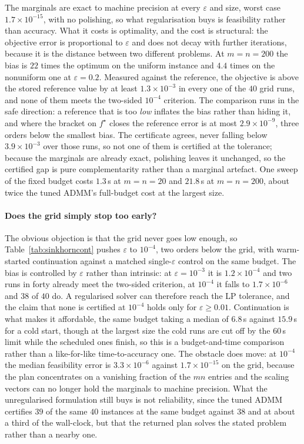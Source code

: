 \documentclass{article}
\newcommand{\Tol}[1]{10^{-#1}}
\begin{document}
The marginals are exact to machine precision at every $\varepsilon$ and size, worst case
$1.7\times\Tol{15}$, with no polishing, so what regularisation buys is feasibility rather
than accuracy. What it costs is optimality, and the cost is structural: the objective error
is proportional to $\varepsilon$ and does not decay with further iterations, because it is
the distance between two different problems. At $m=n=200$ the bias is $22$ times the optimum
on the uniform instance and $4.4$ times on the nonuniform one at $\varepsilon=0.2$. Measured
against the reference, the objective is above the stored reference value by at least
$1.3\times\Tol{3}$ in every one of the $40$ grid runs, and none of them meets the two-sided
$\Tol{4}$ criterion. The comparison runs in the safe direction: a reference that is too
\emph{low} inflates the bias rather than hiding it, and where the bracket on $f^\star$ closes
the reference error is at most $2.9\times\Tol{9}$, three orders below the smallest bias. The
certificate agrees, never falling below $3.9\times\Tol{3}$ over those runs, so not one of
them is certified at the tolerance; because the marginals are already exact, polishing
leaves it unchanged, so the certified gap is pure complementarity rather than a marginal
artefact. One sweep of the fixed budget costs $1.3$\,s at $m=n=20$ and $21.8$\,s at
$m=n=200$, about twice the tuned ADMM's full-budget cost at the largest size.

\paragraph{Does the grid simply stop too early?}
The obvious objection is that the grid never goes low enough, so
Table~\ref{tab:sinkhorncont} pushes $\varepsilon$ to $\Tol{4}$, two orders below the grid,
with warm-started continuation against a matched single-$\varepsilon$ control on the same
budget. The bias is controlled by $\varepsilon$ rather than intrinsic: at
$\varepsilon=\Tol{3}$ it is $1.2\times\Tol{4}$ and two runs in forty already meet the
two-sided criterion, at $\Tol{4}$ it falls to $1.7\times\Tol{6}$ and $38$ of $40$ do. A
regularised solver can therefore reach the LP tolerance, and the claim that none is certified
at $\Tol{4}$ holds only for $\varepsilon\ge0.01$. Continuation is what makes it affordable,
the same budget taking a median of $6.8$\,s against $15.9$\,s for a cold start, though at the
largest size the cold runs are cut off by the $60$\,s limit while the scheduled ones finish,
so this is a budget-and-time comparison rather than a like-for-like time-to-accuracy one. The
obstacle does move: at $\Tol{4}$ the median feasibility error is $3.3\times\Tol{6}$ against
$1.7\times\Tol{15}$ on the grid, because the plan concentrates on a vanishing fraction of the
$mn$ entries and the scaling vectors can no longer hold the marginals to machine precision.
What the unregularised formulation still buys is not reliability, since the tuned ADMM
certifies $39$ of the same $40$ instances at the same budget against $38$ and at about a
third of the wall-clock, but that the returned plan solves the stated problem rather than a
nearby one.
\end{document}
